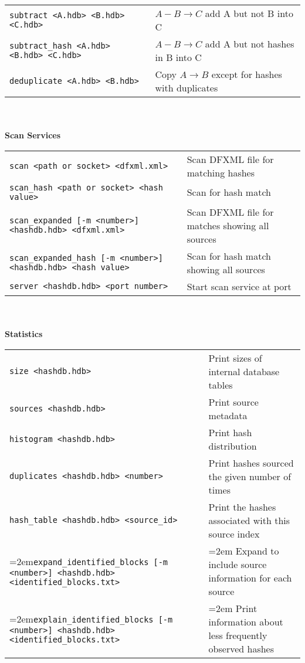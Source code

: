 \begin{small}
\begin{footnotesize}
\begin{tabular}{p{3.6 in} p{3.0 in}}
\texttt{subtract <A.hdb> <B.hdb> <C.hdb>} & $A - B \rightarrow C$ add A but not B into C\\
\texttt{subtract\_hash <A.hdb> <B.hdb> <C.hdb>} & $A - B \rightarrow C$ add A but not hashes in B into C\\
\texttt{deduplicate <A.hdb> <B.hdb>} & Copy $A \rightarrow B$ except for hashes with duplicates \\
\end{tabular}
\\
\\
\textbf{Scan Services} \\
\begin{tabular}{p{3.6 in} p{3.0 in}}
\texttt{scan <path or socket> <dfxml.xml>} & Scan DFXML file for matching hashes \\
\texttt{scan\_hash <path or socket> <hash value>} & Scan for hash match \\
\texttt{scan\_expanded [-m <number>] <hashdb.hdb> <dfxml.xml>} & Scan DFXML file for matches showing all sources\\
\texttt{scan\_expanded\_hash [-m <number>] <hashdb.hdb> <hash value>} & Scan for hash match showing all sources\\
\texttt{server <hashdb.hdb> <port number>} & Start scan service at port\\
\end{tabular}
\\
\\
\textbf{Statistics}\\
\begin{tabular}{p{3.6 in} p{3.0 in}}
\texttt{size <hashdb.hdb>} & Print sizes of internal database tables \\
\texttt{sources <hashdb.hdb>} & Print source metadata \\
\texttt{histogram <hashdb.hdb>} & Print hash distribution \\
\texttt{duplicates <hashdb.hdb> <number>} & Print hashes sourced the given number of times \\
\texttt{hash\_table <hashdb.hdb> <source\_id>} & Print the hashes associated with this source index\\
\hangindent=2em\texttt{expand\_identified\_blocks [-m <number>] <hashdb.hdb> <identified\_blocks.txt>} & \hangindent=2em Expand to include source information for each source \\
\hangindent=2em\texttt{explain\_identified\_blocks [-m <number>] <hashdb.hdb> <identified\_blocks.txt>} & \hangindent=2em Print information about less frequently observed hashes\\

\end{tabular}
\end{footnotesize}
\end{small}
